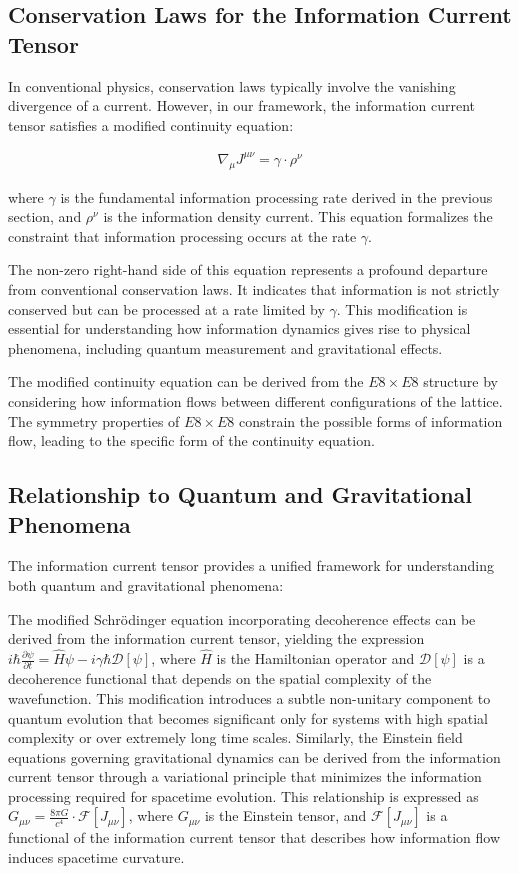 \documentclass[11pt,english,twoside]{article}
\begin{document}
\subsection{Conservation Laws for the Information Current Tensor}

In conventional physics, conservation laws typically involve the vanishing divergence of a current. However, in our framework, the information current tensor satisfies a modified continuity equation:

\begin{align}
    \nabla_\mu J^{\mu\nu} = \gamma \cdot \rho^{\nu} \label{eq:mod_continuity}
\end{align}

where $\gamma$ is the fundamental information processing rate derived in the previous section, and $\rho^{\nu}$ is the information density current. This equation formalizes the constraint that information processing occurs at the rate $\gamma$.

The non-zero right-hand side of this equation represents a profound departure from conventional conservation laws. It indicates that information is not strictly conserved but can be processed at a rate limited by $\gamma$. This modification is essential for understanding how information dynamics gives rise to physical phenomena, including quantum measurement and gravitational effects.

The modified continuity equation can be derived from the $E8\times E8$ structure by considering how information flows between different configurations of the lattice. The symmetry properties of $E8\times E8$ constrain the possible forms of information flow, leading to the specific form of the continuity equation.

\subsection{Relationship to Quantum and Gravitational Phenomena}

The information current tensor provides a unified framework for understanding both quantum and gravitational phenomena:

The modified Schrödinger equation incorporating decoherence effects can be derived from the information current tensor, yielding the expression $i\hbar \frac{\partial \psi}{\partial t} = \hat{H}\psi - i\gamma\hbar \mathcal{D}[\psi]$, where $\hat{H}$ is the Hamiltonian operator and $\mathcal{D}[\psi]$ is a decoherence functional that depends on the spatial complexity of the wavefunction. This modification introduces a subtle non-unitary component to quantum evolution that becomes significant only for systems with high spatial complexity or over extremely long time scales. Similarly, the Einstein field equations governing gravitational dynamics can be derived from the information current tensor through a variational principle that minimizes the information processing required for spacetime evolution. This relationship is expressed as $G_{\mu\nu} = \frac{8\pi G}{c^4} \cdot \mathcal{F}[J_{\mu\nu}]$, where $G_{\mu\nu}$ is the Einstein tensor, and $\mathcal{F}[J_{\mu\nu}]$ is a functional of the information current tensor that describes how information flow induces spacetime curvature.
\end{document}
